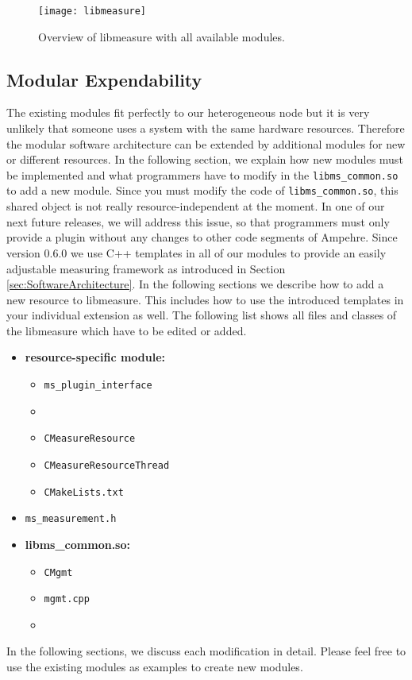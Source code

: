 \begin{figure}
\begin{center}
\texttt{[image: libmeasure]} 
\caption{Overview of libmeasure with all available modules.}
\label{fig:libmeasure_overview}
\end{center}
\end{figure}

\pagebreak

\subsection{Modular Expendability}
The existing modules fit perfectly to our heterogeneous node but it is very unlikely that someone uses a system with the same hardware resources. Therefore the modular software architecture can be extended by additional modules for new or different resources. In the following section, we explain how new modules must be implemented and what programmers have to modify in the \texttt{libms\_common.so} to add a new module. Since you must modify the code of \texttt{libms\_common.so}, this shared object is not really resource-independent at the moment. In one of our next future releases, we will address this issue, so that programmers must only provide a plugin without any changes to other code segments of Ampehre. Since version 0.6.0 we use C++ templates in all of our modules to provide an easily adjustable measuring framework as introduced in Section \ref{sec:SoftwareArchitecture}. In the following sections we describe how to add a new resource to libmeasure. This includes how to use the introduced templates in your individual extension as well. The following list shows all files and classes of the libmeasure which have to be edited or added.

\begin{itemize}
	\item \textbf{resource-specific module:}
	\begin{itemize}
		\item \texttt{ms\_plugin\_interface}
		\item {}
		\item \texttt{CMeasureResource}
		\item \texttt{CMeasureResourceThread}
		\item \texttt{CMakeLists.txt}
	\end{itemize}
	\item \texttt{ms\_measurement.h}
	\item \textbf{libms\_common.so:}
	\begin{itemize}
		\item \texttt{CMgmt}
		\item \texttt{mgmt.cpp}
		\item {} 
	\end{itemize}
\end{itemize}
In the following sections, we discuss each modification in detail. Please feel free to use the existing modules as examples to create new modules.

